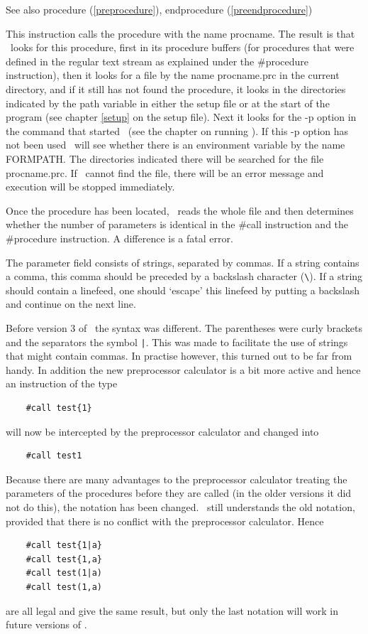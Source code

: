 \noindent See also procedure (\ref{preprocedure}), endprocedure
(\ref{preendprocedure})

\noindent This instruction calls the 
procedure with the name procname. The result is that \FORM\ 
looks for this procedure, first in its procedure 
buffers (for procedures that were defined in the 
regular text stream as explained under the \#procedure\index{\#procedure} 
instruction), then it looks for a file by the name procname.prc in the 
current directory, and if it still has not found the procedure, it looks in 
the directories indicated by the path\index{path} variable in either the setup 
file or at the start of the program (see chapter \ref{setup} on the setup 
file). Next it looks for the -p option in the command that started \FORM\ 
(see the chapter on running \FORM). If this -p option has not been used \FORM\ 
will see whether there is an environment variable by the name 
FORMPATH\index{FORMPATH}. The directories indicated there will be searched 
for the file procname.prc. If \FORM\ cannot find the file, there will be an 
error message and execution will be stopped immediately.

Once the procedure has been located, \FORM\ reads the whole file and then 
determines whether the number of parameters is identical in the 
\#call instruction and the \#procedure 
instruction. A difference is a fatal error.

The parameter field consists of strings, separated by commas. If a string 
contains a comma, this comma should be preceded by a 
backslash character (\verb:\:). If a string should contain 
a linefeed\index{linefeed}, one should `escape' this linefeed by putting a 
backslash and continue on the next line.

Before version 3 of \FORM\ the syntax was different. The parentheses 
were curly brackets and the separators the symbol \verb:|:. This was made 
to facilitate the use of strings that might contain commas. In practise 
however, this turned out to be far from handy. In addition the new 
preprocessor calculator is a bit more active and hence an instruction of 
the type
\begin{verbatim}
    #call test{1}
\end{verbatim}
will now be intercepted by the preprocessor calculator 
and changed into
\begin{verbatim}
    #call test1
\end{verbatim}
Because there are many advantages to the preprocessor calculator treating 
the parameters of the procedures before they are called (in the older 
versions it did not do this), the notation has been changed. \FORM\ still 
understands the old notation, provided that there is no conflict with the 
preprocessor calculator. Hence
\begin{verbatim}
    #call test{1|a}
    #call test{1,a}
    #call test(1|a)
    #call test(1,a)
\end{verbatim}
are all legal and give the same result, but only the last notation will 
work in future versions of \FORM\@.

